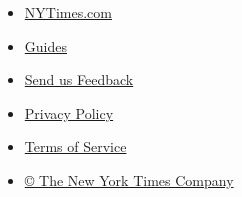 \begin{itemize}
\tightlist
\item
  \href{https://www.nytimes.com}{NYTimes.com}
\item
  \href{//www.nytimes.com/spotlight/guides}{Guides}
\item
  \href{https://nyt.qualtrics.com/jfe/form/SV_7VuAQJbpWqaxzUh?AGENT_ID=}{Send
  us Feedback}
\end{itemize}

\begin{itemize}
\tightlist
\item
  \href{http://www.nytimes.com/privacy}{Privacy Policy}
\item
  \href{http://www.nytimes.com/ref/membercenter/help/agree.html}{Terms
  of Service}
\item
  \href{http://www.nytimes.com/content/help/rights/copyright/copyright-notice.html}{©
  The New York Times Company}
\end{itemize}

